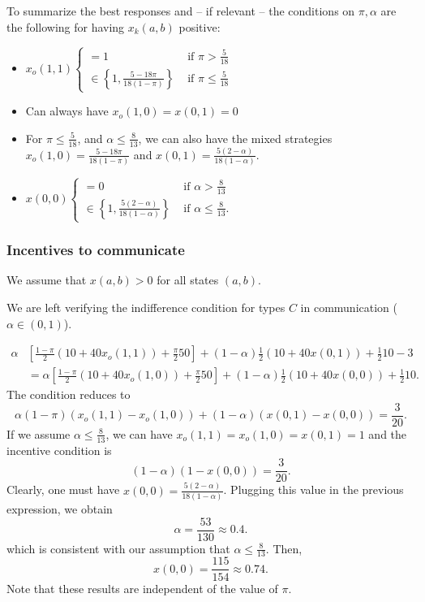 \documentclass[12pt]{article}
\theoremstyle{break}
\begin{document}
To summarize the best responses and -- if relevant -- the conditions on $\pi,\alpha$ are the following for having $x_k(a,b)$ positive:

\begin{itemize}\setlength\itemsep{0em}
	\item $x_o(1,1)\begin{cases}
		=1 &\text{ if } \pi >\frac{5}{18}\\
		\in\left\{1,\frac{5-18\pi}{18(1-\pi)}\right\}&\text{ if } \pi \leq \frac{5}{18}
	\end{cases}$
	\item Can always have $x_o(1,0)=x(0,1)=0$
	\item For $\pi\leq \frac{5}{18}$, and $\alpha\leq \frac{8}{13}$, we can also have the mixed strategies $x_o(1,0)=\frac{5-18\pi}{18(1-\pi)}$ and $x(0,1)=\frac{5(2-\alpha)}{18(1-\alpha)}$.
	\item $x(0,0)\begin{cases}
		=0 &\text{ if } \alpha >\frac{8}{13}\\
		\in\left\{1,\frac{5(2-\alpha)}{18(1-\alpha)}\right\}&\text{ if } \alpha \leq \frac{8}{13}.
	\end{cases}$
\end{itemize}

\subsubsection*{Incentives to communicate}
We assume that $x(a,b)>0$ for all states $(a,b)$.

We are left verifying the indifference condition for types $C$ in communication ($\alpha\in(0,1)$).

\begin{align*}
	\alpha&\left[\frac{1-\pi}{2}(10+40 x_o(1,1))+\frac{\pi}{2}50\right]+(1-\alpha)\frac{1}{2}(10+40x(0,1))+\frac{1}{2}10-3\\
		&=\alpha\left[\frac{1-\pi}{2}(10+40 x_o(1,0))+\frac{\pi}{2}50\right]+(1-\alpha)\frac{1}{2}(10+40x(0,0))+\frac{1}{2}10.
\end{align*}
The condition reduces to 
\begin{equation}\label{IC-comm}
	\alpha (1-\pi ) (x_o(1,1)-x_o(1,0))+(1-\alpha) (x(0,1)-x(0,0))=\frac{3}{20}.	
\end{equation}
%
If we assume $\alpha\leq \frac{8}{13}$, we can have $x_o(1,1)=x_o(1,0)=x(0,1)=1$ and the incentive condition is 
\[
(1-\alpha) (1-x(0,0))=\frac{3}{20}.
\]
Clearly, one must have $x(0,0)=\frac{5(2-\alpha)}{18(1-\alpha)}$. Plugging this value in the previous expression, we obtain 
\[
\alpha=\frac{53}{130}\approx 0.4.
\]
which is consistent with our assumption that $\alpha\leq \frac{8}{13}$. Then, 
\[
x(0,0)=\frac{115}{154}\approx 0.74.
\]
%
Note that these results are independent of the value of $\pi$. 
\end{document}
